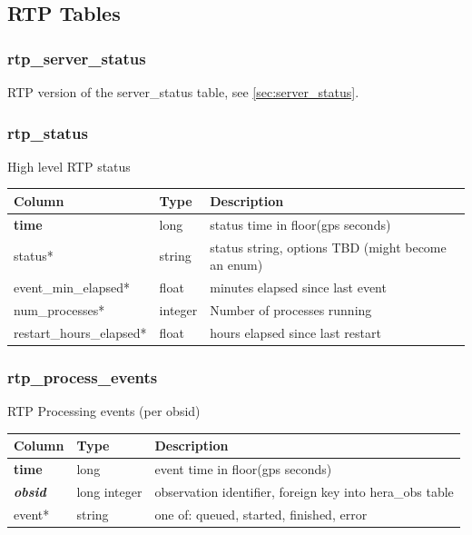\documentclass{article}
\begin{document}
{\subsection{RTP Tables}
\subsubsection{rtp\_server\_status}
RTP version of the server\_status table, see \ref{sec:server_status}.

\subsubsection{rtp\_status}
High level RTP status
\begin{center}
 \begin{tabular}{| p{4cm} | p{2cm} | p{10cm} |}
\hline
 {\bf Column} & {\bf Type}  & {\bf Description} \\ [0.5ex]  \hline\hline
\textbf{time} & long & status time in floor(gps seconds)\\ \hline
status* & string & status string, options TBD (might become an enum) \\\hline
event\_min\_elapsed* & float & minutes elapsed since last event \\\hline
num\_processes* & integer & Number of processes running  \\\hline
restart\_hours\_elapsed* & float & hours elapsed since last restart \\\hline
\end{tabular}
\end{center}

\subsubsection{rtp\_process\_events}
RTP Processing events (per obsid)
\begin{center}
 \begin{tabular}{| p{4cm} | p{2cm} | p{10cm} |}
\hline
 {\bf Column} & {\bf Type}  & {\bf Description} \\ [0.5ex]  \hline\hline
\textbf{time} & long & event time in floor(gps seconds) \\ \hline
\textit{\textbf{obsid}} & long integer & observation identifier, foreign key into hera\_obs table \\ \hline
event* & string & one of: queued, started, finished, error  \\\hline
\end{tabular}
\end{center}

}
\end{document}
